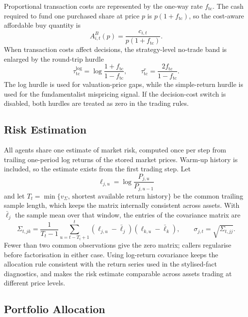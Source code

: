 \documentclass[12pt, a4paper]{article}
\begin{document}
    Proportional transaction costs are represented by the one-way rate
    \(f_{\mathrm{tc}}\). The cash required to fund one purchased share at price
    \(p\) is \(p(1+f_{\mathrm{tc}})\), so the cost-aware affordable buy quantity is
    \[
        A_{i,t}^{B}(p)
        =
        \frac{c_{i,t}}{p(1+f_{\mathrm{tc}})}.
    \]
    When transaction costs affect decisions, the strategy-level no-trade band is
    enlarged by the round-trip hurdle
    \[
        \tau_{\mathrm{tc}}^{\log}
        =
        \log\frac{1+f_{\mathrm{tc}}}{1-f_{\mathrm{tc}}},
        \qquad
        \tau_{\mathrm{tc}}^{r}
        =
        \frac{2f_{\mathrm{tc}}}{1-f_{\mathrm{tc}}}.
    \]
    The log hurdle is used for valuation-price gaps, while the simple-return
    hurdle is used for the fundamentalist mispricing signal. If the
    decision-cost switch is disabled, both hurdles are treated as zero in the
    trading rules.

    \subsection{Risk Estimation}\label{sec:covariance}

    All agents share one estimate of market risk, computed once per step from
    trailing one-period log returns of the stored market prices. Warm-up history
    is included, so the estimate exists from the first trading step. Let
    \[
        \ell_{j,u}=\log\frac{P_{j,u}}{P_{j,u-1}}
    \]
    and let \(T_t=\min\{v_{\Sigma},\,\text{shortest available return history}\}\)
    be the common trailing sample length, which keeps the matrix internally
    consistent across assets. With \(\bar\ell_j\) the sample mean over that
    window, the entries of the covariance matrix are
    \[
        \Sigma_{t,jk}
        =
        \frac{1}{T_t-1}
        \sum_{u=t-T_t+1}^{t}
        \left(\ell_{j,u}-\bar\ell_j\right)\left(\ell_{k,u}-\bar\ell_k\right),
        \qquad
        \sigma_{j,t}=\sqrt{\Sigma_{t,jj}}.
    \]
    Fewer than two common observations give the zero matrix; callers regularise
    before factorisation in either case. Using log-return covariance keeps the
    allocation rule consistent with the return series used in the stylised-fact
    diagnostics, and makes the risk estimate comparable across assets trading at
    different price levels.

    \subsection{Portfolio Allocation}\label{sec:allocation}
\end{document}
